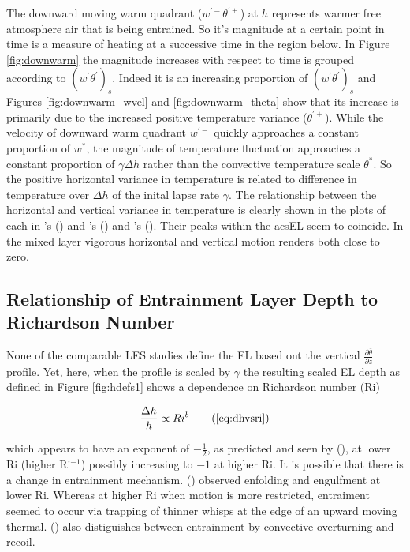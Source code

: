 {The downward moving warm quadrant ($w^{'-}\theta^{'+}$) at $h$ represents warmer free atmosphere air that is being entrained.  So it's magnitude at a certain point in time is a measure of heating at a successive time in the region below.  In Figure \ref{fig:downwarm} the magnitude increases with respect to time is grouped according to $(\overline{w^{'}\theta^{'}})_{s}$.  Indeed it is an increasing proportion of  $(\overline{w^{'}\theta^{'}})_{s}$ and Figures \ref{fig:downwarm_wvel} and \ref{fig:downwarm_theta} show that its increase is primarily due to the increased positive temperature variance ($\theta^{'+}$).  While the velocity of downward warm quadrant $w^{'-}$ quickly approaches a constant proportion of $w^{*}$, the magnitude of temperature fluctuation approaches a constant proportion of $\gamma \Delta h$ rather than the convective temperature scale $\theta^{*}$.  So the positive horizontal variance in temperature is related to difference in temperature over $\Delta h$ of the inital lapse rate $\gamma$.  The relationship between the horizontal and vertical variance in temperature is clearly shown in the plots of each in \citeauthor{Sorbjan}'s (\citeyear{Sorbjan}) and \citeauthor{SullMoengStev}'s (\citeyear{SullMoengStev}) and \citeauthor{GarciaMellado}'s (\citeyear{GarciaMellado}). Their peaks within the acs{EL} seem to coincide.  In the mixed layer vigorous horizontal and vertical motion renders both close to zero.\\             

\subsection{Relationship of Entrainment Layer Depth to Richardson Number}

None of the comparable \acs{LES} studies define the \acs{EL} based ont the vertical $\frac{\partial \overline{\theta}}{\partial z}$ profile.  Yet, here, when the profile is scaled by $\gamma$ the resulting scaled \acs{EL} depth as defined in Figure \ref{fig:hdefs1} shows a dependence on Richardson number (\acs{Ri}) 

\begin{equation}
\frac{\Delta h}{h} \propto Ri ^{b} \tag{\ref{eq:dhvsri}}
\end{equation}


which appears to have an exponent of $-\frac{1}{2}$, as predicted and seen by \citeauthor{Boers89} (\citeyear{Boers89}), at lower \acs{Ri} (higher \acs{Ri}$^{-1}$) possibly increasing to $-1$ at higher \acs{Ri}.  It is possible that there is a change in entrainment mechanism. \citeauthor{SullMoengStev} (\citeyear{SullMoengStev}) observed enfolding and engulfment at lower \acs{Ri}.  Whereas at higher \acs{Ri} when motion is more restricted, entraiment seemed to occur via trapping of thinner whisps at the edge of an upward moving thermal.  \citeauthor{Turner86} (\citeyear{Turner86}) also distiguishes between entrainment by convective overturning and recoil.\\    


}
